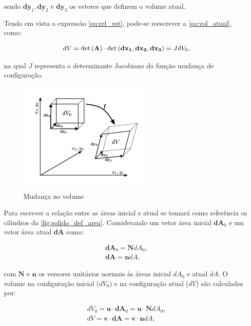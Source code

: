 \noindent  sendo $\mathbf{dy}_1,\mathbf{dy}_2$ e $\mathbf{dy}_3$ os vetores que definem o volume atual.

Tendo em vista a expressão \ref{eq:rel_vet}, pode-se reescrever a \autoref{eq:vol_atual}, como:

\begin{align}
dV = \det{\left(\mathbf{A}\right)} \cdot \det{(\mathbf{dx_1},\mathbf{dx_2},\mathbf{dx_3})}  = JdV_{0} \label {eq:vol_atual2},
\end{align}

\noindent na qual $J$ representa o determinante Jacobiano da função mudança de configuração.

\begin{figure}[!htbp]
	\caption{Mudança no volume}
	\centering
	\includegraphics[scale=2.0]{Imagens/Cap4/sol_def_vol.pdf}	
	\label{fig:solido_def_vol}
\end{figure}

Para escrever a relação entre as áreas inicial e atual se tomará como referência os cilindros da \autoref{fig:solido_def_area}. Considerando um vetor área inicial $\mathbf{dA}_{0}$ e um vetor área atual $\mathbf{dA}$ como:

\begin{align}
\mathbf{dA}_{0} = \mathbf{N}dA_{0},\\
\mathbf{dA} = \mathbf{n}dA \label{eq:areas},
\end{align}

\noindent com $\mathbf{N}$ e $\mathbf{n}$ os versores unitários normais às áreas inicial $dA_{0}$ e atual $dA$. O volume na configuração inicial ($dV_{0}$) e na configuração atual ($dV$) são calculados por:

\begin{align}
dV_{0} = \mathbf{u} \cdot \mathbf{dA}_{0} = \mathbf{u} \cdot \mathbf{N} dA_0 ,\\
dV = \mathbf{v} \cdot \mathbf{dA} = \mathbf{v} \cdot \mathbf{n} dA \label{eq:vol_func_area},
\end{align}

